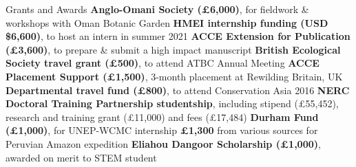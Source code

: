 \begin{rubric}{Grants and Awards}
\entry*[2022] \textbf{Anglo-Omani Society (£6,000)}, for fieldwork \& workshops with Oman Botanic Garden
\entry*[2021] \textbf{HMEI internship funding (USD \$6,600)}, to host an intern in summer 2021
\entry*[2018] \textbf{ACCE Extension for Publication (£3,600)}, to prepare \& submit a high impact manuscript
\entry*[2018] \textbf{British Ecological Society travel grant (£500)}, to attend ATBC Annual Meeting
\entry*[2016] \textbf{ACCE Placement Support (£1,500)}, 3-month placement at Rewilding Britain, UK
\entry*[2016] \textbf{Departmental travel fund (£800)}, to attend Conservation Asia 2016
\entry*[2014] \textbf{NERC Doctoral Training Partnership studentship}, including stipend (£55,452), research and training grant (£11,000) and fees (£17,484)
\entry*[2013] \textbf{Durham Fund (£1,000)}, for UNEP-WCMC internship
\entry*[2011] \textbf{£1,300} from various sources for Peruvian Amazon expedition
\entry*[2010] \textbf{Eliahou Dangoor Scholarship (£1,000)}, awarded on merit to STEM student
\end{rubric}